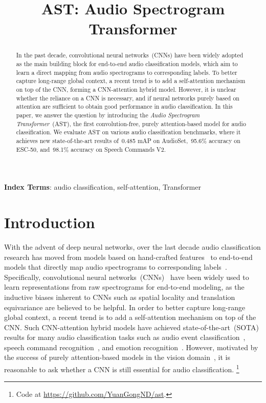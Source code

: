 \documentclass[a4paper]{article}
\title{AST: Audio Spectrogram Transformer}
\newcommand\blfootnote[1]{%
  \begingroup
  \renewcommand\thefootnote{}\footnote{#1}%
  \addtocounter{footnote}{-1}%
  \endgroup
}
\begin{document}
\maketitle
% 
\begin{abstract}

In the past decade, convolutional neural networks~(CNNs) have been widely adopted as the main building block for end-to-end audio classification models, which aim to learn a direct mapping from audio spectrograms to corresponding labels. To better capture long-range global context, a recent trend is to add a self-attention mechanism on top of the CNN, forming a CNN-attention hybrid model. However, it is unclear whether the reliance on a CNN is necessary, and if neural networks purely based on attention are sufficient to obtain good performance in audio classification. In this paper, we answer the question by introducing the \emph{Audio Spectrogram Transformer}~(AST), the first convolution-free, purely attention-based model for audio classification. We evaluate AST on various audio classification benchmarks, where it achieves new state-of-the-art results of~0.485 mAP on AudioSet,~95.6\% accuracy on ESC-50, and~98.1\% accuracy on Speech Commands V2. 

\end{abstract}
\noindent\textbf{Index Terms}: audio classification, self-attention, Transformer


\section{Introduction}
\label{sec:intro}

With the advent of deep neural networks, over the last decade audio classification research has moved from models based on hand-crafted features~\cite{eyben2013recent,schuller2013interspeech} to end-to-end models that directly map audio spectrograms to corresponding labels~\cite{jaitly2011learning,dieleman2014end,trigeorgis2016adieu}.
Specifically, convolutional neural networks~(CNNs)~\cite{lecun1995convolutional} have been widely used to learn representations from raw spectrograms for end-to-end modeling, as the inductive biases inherent to CNNs such as spatial locality and translation equivariance are believed to be helpful.
In order to better capture long-range global context, a recent trend is to add a self-attention mechanism on top of the CNN.
Such CNN-attention hybrid models have achieved state-of-the-art~(SOTA) results for many audio classification tasks such as audio event classification~\cite{kong2020panns,gong2021psla}, speech command recognition~\cite{rybakov2020streaming}, and emotion recognition~\cite{li2018attention}.
However, motivated by the success of purely attention-based models in the vision domain~\cite{dosovitskiy2021image,touvron2020deit,yuan2021tokens}, it is reasonable to ask whether a CNN is still essential for audio classification. 
\blfootnote{Code at \url{https://github.com/YuanGongND/ast}.}
\end{document}

